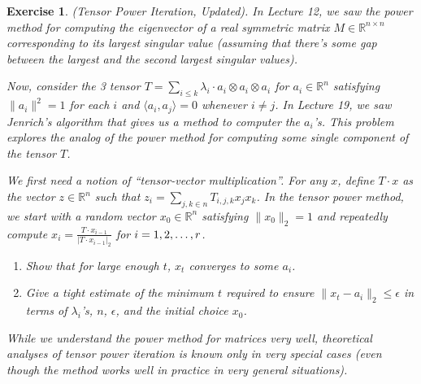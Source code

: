 \documentclass[12pt]{article}
\theoremstyle{colon}
\newtheorem{exercise}{Exercise}
\begin{document}
\clearpage

\begin{exercise}
  (Tensor Power Iteration, Updated). In Lecture 12, we saw the power method for computing the eigenvector of a real symmetric matrix $M \in \mathbb{R}^{n \times n}$ corresponding to its largest singular value (assuming that there's some gap between the largest and the second largest singular values).

  Now, consider the 3 tensor $T = \sum_{i \leq k} \lambda_i \cdot a_i \otimes a_i \otimes a_i$ for $a_i \in \mathbb{R}^n$ satisfying $\lVert a_i \rVert^2 = 1$ for each $i$ and $\langle a_i, a_j \rangle = 0$ whenever $i \neq j$. In Lecture 19, we saw Jenrich's algorithm that gives us a method to computer the $a_i$'s. This problem explores the analog of the power method for computing some single component of the tensor $T$.

  We first need a notion of ``tensor-vector multiplication''. For any $x$, define $T \cdot x$ as the vector $z \in \mathbb{R}^n$ such that $z_i = \sum_{j,k \in n} T_{i,j,k} x_j x_k$. In the \textit{tensor power method}, we start with a random vector $x_0 \in \mathbb{R}^n$ satisfying $\lVert x_0 \rVert_2 = 1$ and repeatedly compute $x_i = \frac{T \cdot x_{i-1}}{\lvert T \cdot x_{i-1} \rvert_2}$ for $i = 1,2, \mathellipsis, r$.

  \begin{enumerate}[label=\alph*)]
    \item Show that for large enough $t$, $x_t$ converges to some $a_i$.
    \item Give a tight estimate of the minimum $t$ required to ensure $\lVert x_t - a_i \rVert_2 \leq \epsilon$ in terms of $\lambda_i$'s, $n$, $\epsilon$, and the initial choice $x_0$.
  \end{enumerate}

  While we understand the power method for matrices very well, theoretical analyses of tensor power iteration is known only in very special cases (even though the method works well in practice in very general situations).
\end{exercise}
\end{document}
